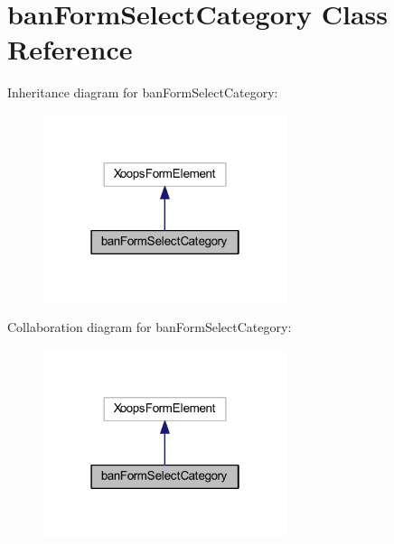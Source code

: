 \hypertarget{classban_form_select_category}{\section{ban\-Form\-Select\-Category Class Reference}
\label{classban_form_select_category}
}


Inheritance diagram for ban\-Form\-Select\-Category\-:
\nopagebreak
\begin{figure}[H]
\begin{center}
\leavevmode
\includegraphics[width=202pt]{classban_form_select_category__inherit__graph}
\end{center}
\end{figure}


Collaboration diagram for ban\-Form\-Select\-Category\-:
\nopagebreak
\begin{figure}[H]
\begin{center}
\leavevmode
\includegraphics[width=202pt]{classban_form_select_category__coll__graph}
\end{center}
\end{figure}
